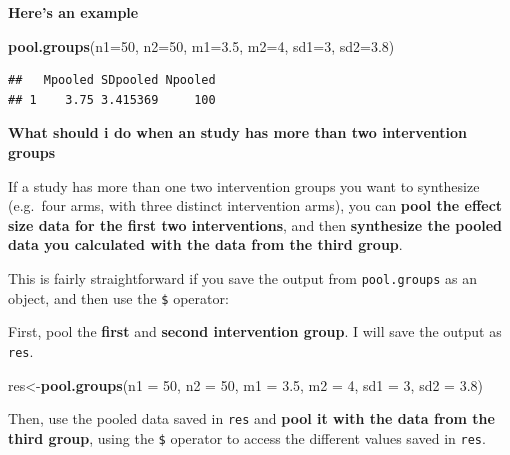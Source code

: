 \documentclass[]{book}
\newenvironment{Shaded}{\begin{snugshade}}{\end{snugshade}}
\newcommand{\DataTypeTok}[1]{\textcolor[rgb]{0.13,0.29,0.53}{#1}}
\newcommand{\DecValTok}[1]{\textcolor[rgb]{0.00,0.00,0.81}{#1}}
\newcommand{\FloatTok}[1]{\textcolor[rgb]{0.00,0.00,0.81}{#1}}
\newcommand{\KeywordTok}[1]{\textcolor[rgb]{0.13,0.29,0.53}{\textbf{#1}}}
\newcommand{\NormalTok}[1]{#1}
\begin{document}
\textbf{Here's an example}

\begin{Shaded}
\begin{Highlighting}[]
\KeywordTok{pool.groups}\NormalTok{(}\DataTypeTok{n1=}\DecValTok{50}\NormalTok{,}
            \DataTypeTok{n2=}\DecValTok{50}\NormalTok{,}
            \DataTypeTok{m1=}\FloatTok{3.5}\NormalTok{,}
            \DataTypeTok{m2=}\DecValTok{4}\NormalTok{,}
            \DataTypeTok{sd1=}\DecValTok{3}\NormalTok{,}
            \DataTypeTok{sd2=}\FloatTok{3.8}\NormalTok{)}
\end{Highlighting}
\end{Shaded}

\begin{verbatim}
##   Mpooled SDpooled Npooled
## 1    3.75 3.415369     100
\end{verbatim}

\begin{rmdinfo}
\textbf{What should i do when an study has more than two intervention
groups}

If a study has more than one two intervention groups you want to
synthesize (e.g.~four arms, with three distinct intervention arms), you
can \textbf{pool the effect size data for the first two interventions},
and then \textbf{synthesize the pooled data you calculated with the data
from the third group}.

This is fairly straightforward if you save the output from
\texttt{pool.groups} as an object, and then use the \texttt{\$}
operator:
\end{rmdinfo}

First, pool the \textbf{first} and \textbf{second intervention group}. I will save the output as \texttt{res}.

\begin{Shaded}
\begin{Highlighting}[]
\NormalTok{res<-}\KeywordTok{pool.groups}\NormalTok{(}\DataTypeTok{n1 =} \DecValTok{50}\NormalTok{,}
            \DataTypeTok{n2 =} \DecValTok{50}\NormalTok{,}
            \DataTypeTok{m1 =} \FloatTok{3.5}\NormalTok{,}
            \DataTypeTok{m2 =} \DecValTok{4}\NormalTok{,}
            \DataTypeTok{sd1 =} \DecValTok{3}\NormalTok{,}
            \DataTypeTok{sd2 =} \FloatTok{3.8}\NormalTok{)}
\end{Highlighting}
\end{Shaded}

Then, use the pooled data saved in \texttt{res} and \textbf{pool it with the data from the third group}, using the \texttt{\$} operator to access the different values saved in \texttt{res}.
\end{document}
